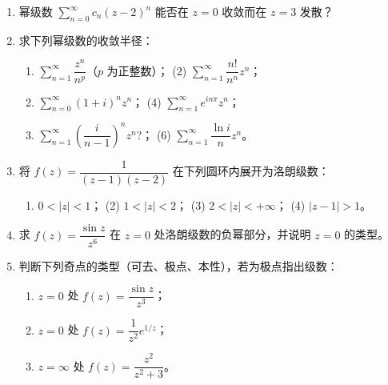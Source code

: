 \begin{enumerate}
  \begin{enumerate}
  \def\labelenumii{(\arabic{enumii})}
  \tightlist
  \item
    每一个幂级数在它的收敛圆周上处处收敛；
  \item
    每一个幂级数的和函数在收敛圆内可能有奇点；
  \item
    每一个在 \(z_0\) 连续的函数一定可以在 \(z_0\) 邻域内展开成 Taylor
    级数。
  \end{enumerate}
\item
  幂级数 \(\sum_{n=0}^\infty c_n(z-2)^n\) 能否在 \(z=0\) 收敛而在
  \(z=3\) 发散？
\item
  求下列幂级数的收敛半径：

  \begin{enumerate}
  \def\labelenumii{(\arabic{enumii})}
  \tightlist
  \item
    \(\sum_{n=1}^\infty\dfrac{z^n}{n^p}\)（\(p\) 为正整数）； (2)
    \(\sum_{n=1}^\infty\dfrac{n!}{n^n}z^n\)；
  \item
    \(\sum_{n=0}^\infty(1+i)^n z^n\)； (4)
    \(\sum_{n=1}^\infty e^{in\pi}z^n\)；
  \item
    \(\sum_{n=1}^\infty\left(\dfrac{i}{n-1}\right)^n z^n\)?； (6)
    \(\sum_{n=1}^\infty\dfrac{\ln i}{n}z^n\)。
  \end{enumerate}
\item
  将 \(f(z)=\dfrac{1}{(z-1)(z-2)}\) 在下列圆环内展开为洛朗级数：

  \begin{enumerate}
  \def\labelenumii{(\arabic{enumii})}
  \tightlist
  \item
    \(0<|z|<1\)； (2) \(1<|z|<2\)； (3) \(2<|z|<+\infty\)； (4)
    \(|z-1|>1\)。
  \end{enumerate}
\item
  求 \(f(z)=\dfrac{\sin z}{z^6}\) 在 \(z=0\)
  处洛朗级数的负幂部分，并说明 \(z=0\) 的类型。
\item
  判断下列奇点的类型（可去、极点、本性），若为极点指出级数：

  \begin{enumerate}
  \def\labelenumii{(\arabic{enumii})}
  \tightlist
  \item
    \(z=0\) 处 \(f(z)=\dfrac{\sin z}{z^3}\)；
  \item
    \(z=0\) 处 \(f(z)=\dfrac{1}{z^2}e^{1/z}\)；
  \item
    \(z=\infty\) 处 \(f(z)=\dfrac{z^2}{z^2+3}\)。
  \end{enumerate}
\end{enumerate}

